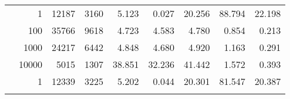 \begin{table}
\begin{tabular}{rrrrrrrrr}
	            
	        
				\noalign{\smallskip}\hline
				\multirow{ 4 }{*}{ 80000 } &
				
					
					 
					\multirow{ 1 }{*}{ 1 } &
					
						
							    
							     12187  & 3160  
	                           & 5.123 & 0.027 & 20.256
	                           & 88.794 & 22.198  \\
	                
	            
					 &  
					 
					\multirow{ 1 }{*}{ 100 } &
					
						
							    
							     35766  & 9618  
	                           & 4.723 & 4.583 & 4.780
	                           & 0.854 & 0.213  \\
	                
	            
					 &  
					 
					\multirow{ 1 }{*}{ 1000 } &
					
						
							    
							     24217  & 6442  
	                           & 4.848 & 4.680 & 4.920
	                           & 1.163 & 0.291  \\
	                
	            
					 &  
					 
					\multirow{ 1 }{*}{ 10000 } &
					
						
							    
							     5015  & 1307  
	                           & 38.851 & 32.236 & 41.442
	                           & 1.572 & 0.393  \\
	                
	            
	        
				\noalign{\smallskip}\hline
				\multirow{ 4 }{*}{ 160000 } &
				
					
					 
					\multirow{ 1 }{*}{ 1 } &
					
						
							    
							     12339  & 3225  
	                           & 5.202 & 0.044 & 20.301
	                           & 81.547 & 20.387  \\
	                
	            
					 &  
					 

\end{tabular}
\end{table}
